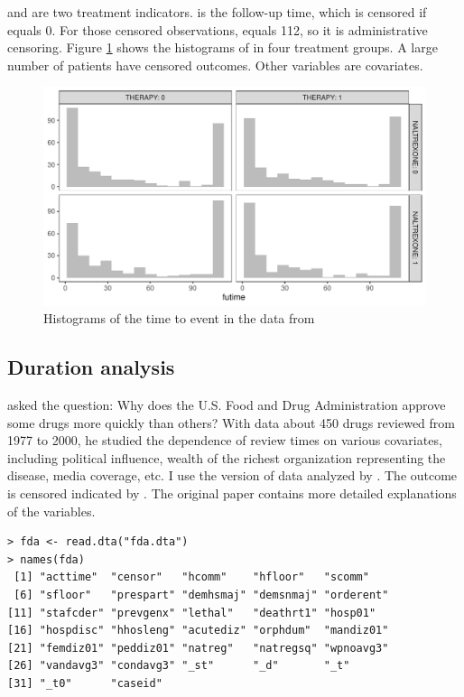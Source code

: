  and  are two treatment indicators.  is the follow-up time, which is censored if  equals 0. For those censored observations,  equals 112, so it is administrative censoring. Figure \ref{fig::histogram_combine_lindata} shows the histograms of  in four treatment groups. A large number of patients have censored outcomes. 
Other variables are covariates. 


\begin{figure}[th]
\centering
\includegraphics[width = \textwidth]{figures/combine_histograms.pdf}
\caption{Histograms of the time to event in the data from \citet{lin2016simultaneous}}\label{fig::histogram_combine_lindata}
\end{figure}



\subsection{Duration analysis}

\citet{carpenter2002groups} asked the question: Why does the U.S. Food and Drug Administration approve some drugs more quickly than others? With data about 450 drugs reviewed from 1977 to 2000, he studied the dependence of review times on various covariates, including political influence, wealth of the richest organization representing the disease, media coverage, etc. I use the version of data analyzed by
\citet{keele2010proportionally}. 
The outcome  is censored indicated by .
The original paper contains more detailed explanations of the variables. 


\begin{lstlisting}
> fda <- read.dta("fda.dta")
> names(fda)
 [1] "acttime"  "censor"   "hcomm"    "hfloor"   "scomm"   
 [6] "sfloor"   "prespart" "demhsmaj" "demsnmaj" "orderent"
[11] "stafcder" "prevgenx" "lethal"   "deathrt1" "hosp01"  
[16] "hospdisc" "hhosleng" "acutediz" "orphdum"  "mandiz01"
[21] "femdiz01" "peddiz01" "natreg"   "natregsq" "wpnoavg3"
[26] "vandavg3" "condavg3" "_st"      "_d"       "_t"      
[31] "_t0"      "caseid"  
\end{lstlisting}


